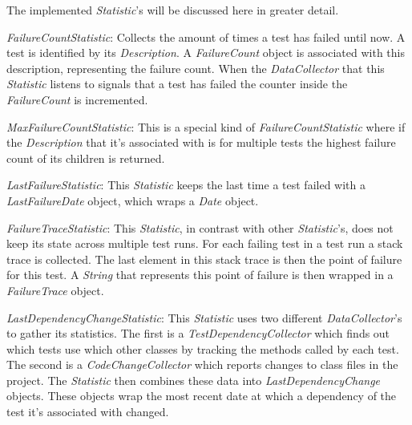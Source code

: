 \documentclass[i2]{oss}
\newcommand{\class}[1]{\emph{#1}}
\begin{document}
The implemented \class{Statistic}'s will be discussed here in greater 
detail.
\begin{description}
\item \class{FailureCountStatistic}: Collects the amount of times a test 
has failed until now.
A test is identified by its \class{Description}.
A \class{FailureCount} object is associated with this description,
representing the failure count.
When the \class{DataCollector} that this \class{Statistic} listens to
signals that a test has failed the counter inside the 
\class{FailureCount} is incremented.
\item \class{MaxFailureCountStatistic}: This is a special kind of 
\class{FailureCountStatistic} where if the \class{Description} that it's
associated with is for multiple tests the highest failure count of its 
children is returned.
\item \class{LastFailureStatistic}: This \class{Statistic} keeps the 
last time a test failed with a \class{LastFailureDate} object, which
wraps a \class{Date} object.
\item \class{FailureTraceStatistic}: This \class{Statistic}, in contrast
with other \class{Statistic}'s, does not keep its state across multiple
test runs.
For each failing test in a test run a stack trace is collected. 
The last element in this stack trace is then the point of failure for 
this test.
A \class{String} that represents this point of failure is then wrapped
in a \class{FailureTrace} object.
\item \class{LastDependencyChangeStatistic}: This \class{Statistic} uses
two different \class{DataCollector}'s to gather its statistics.
The first is a \class{TestDependencyCollector} which finds out which 
tests use which other classes by tracking the methods called by each
test.
The second is a \class{CodeChangeCollector} which reports changes to
class files in the project.
The \class{Statistic} then combines these data into 
\class{LastDependencyChange} objects.
These objects wrap the most recent date at which a dependency of the 
test it's associated with changed.
\end{description}

\end{document}
